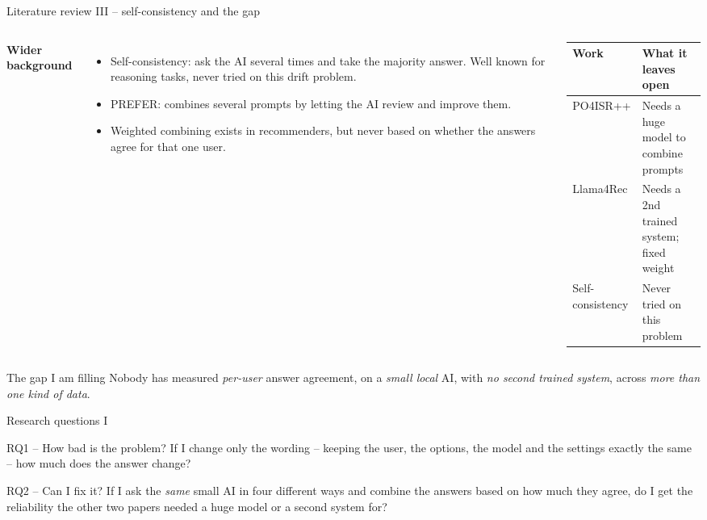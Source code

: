 \documentclass[aspectratio=169,12pt]{beamer}
\begin{document}
\begin{frame}{Literature review III -- self-consistency and the gap}
\begin{columns}[T]
\textbf{Wider background}
\begin{itemize}
  \item Self-consistency: ask the AI several times and take the majority
        answer. Well known for reasoning tasks, never tried on this drift
        problem.
  \item PREFER: combines several prompts by letting the AI review and
        improve them.
  \item Weighted combining exists in recommenders, but never based on
        whether the answers agree for that one user.
\end{itemize}

\small
\begin{tabularx}{\linewidth}{@{}p{0.30\linewidth}X@{}}
\toprule
\textbf{Work} & \textbf{What it leaves open}\\
\midrule
PO4ISR++ & Needs a huge model to combine prompts\\
Llama4Rec & Needs a 2nd trained system; fixed weight\\
Self-consistency & Never tried on this problem\\
\bottomrule
\end{tabularx}
\end{columns}

\vspace{0.6em}
\begin{alertblock}{The gap I am filling}
Nobody has measured \emph{per-user} answer agreement, on a \emph{small
local} AI, with \emph{no second trained system}, across \emph{more than one
kind of data}.
\end{alertblock}
\end{frame}

\begin{frame}{Research questions I}
\begin{block}{RQ1 -- How bad is the problem?}
If I change only the wording -- keeping the user, the options, the model
and the settings exactly the same -- how much does the answer change?
\end{block}

\vspace{0.8em}
\begin{block}{RQ2 -- Can I fix it?}
If I ask the \emph{same} small AI in four different ways and combine the
answers based on how much they agree, do I get the reliability the other
two papers needed a huge model or a second system for?
\end{block}
\end{frame}
\end{document}
